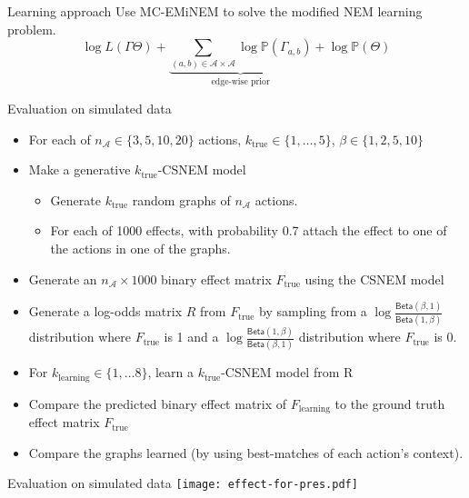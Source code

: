 \documentclass[aspectratio=169]{beamer}
\begin{document}
\begin{frame}{Learning approach}
Use MC-EMiNEM \parencite{niederberger2012mc} to solve the modified NEM learning problem.
\[
\log L( \Gamma \Theta ) + \underbrace{\sum_{(a,b) \in \mathcal A \times \mathcal A} \log \mathbb P(\Gamma_{a,b})}_{\text{edge-wise prior}} + \log \mathbb P( \Theta )
\]
\end{frame}



\begin{frame}{Evaluation on simulated data}
\begin{itemize}[<+->]
 \item \small For each of $n_\mathcal{A} \in \{3,5,10,20\}$ actions, $k_\text{true} \in \{1,\ldots, 5\}$, $\beta \in \{1, 2, 5, 10 \}$
 \item Make a generative $k_\text{true}$-CSNEM model
 \begin{itemize}
  \item Generate $k_\text{true}$ random graphs of $n_\mathcal{A}$ actions.
  \item For each of 1000 effects, with probability 0.7 attach the effect to one of the actions in one of the graphs.
 \end{itemize}
 \item Generate an $n_\mathcal{A} \times 1000$ binary effect matrix $F_\text{true}$ using the CSNEM model
 \item Generate a log-odds matrix $R$ from $F_\text{true}$ by sampling from a $\log \frac{ \mathsf{Beta}(\beta,1) }{ \mathsf{Beta}(1,\beta) }$ distribution where $F_\text{true}$ is 1 and a $\log \frac{ \mathsf{Beta}(1,\beta) }{ \mathsf{Beta}(\beta,1) }$ distribution where $F_\text{true}$ is 0.
 \item For $k_\text{learning} \in \{ 1, \ldots 8 \}$, learn a $k_\text{true}$-CSNEM model from R
 \item Compare the predicted binary effect matrix of $F_\text{learning}$ to the ground truth effect matrix $F_\text{true}$
 \item Compare the graphs learned (by using best-matches of each action's context).
\end{itemize}
\end{frame}


\begin{frame}{Evaluation on simulated data}
\texttt{[image: effect-for-pres.pdf]}
\end{frame}
\end{document}
